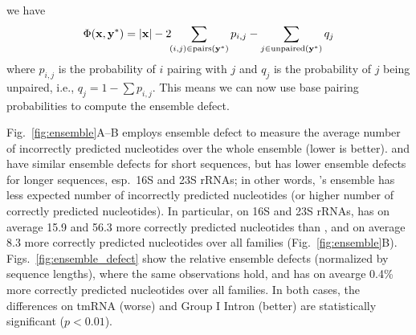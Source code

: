   we have~\cite{Zadeh+:2010}
\begin{equation}
\vspace{-0.2cm}
\begin{split}
\Phi(\vecx,\vecystar) = |\vecx| - 2\!\! \sum_{(i,j) \in \pairs(\vecystar)} p_{i,j} - \sum_{j \in \unpaired(\vecystar)} q_{j} \notag
\end{split}
\label{eq:phi2}
\vspace{-0.2cm}
\end{equation}
where $p_{i,j}$ is the probability of $i$ pairing with $j$ %
and $q_{j}$ is the probability of $j$ being unpaired, i.e., $q_j = 1- \sum p_{i,j}$.
This means we can now use base pairing probabilities to compute the ensemble defect.






Fig.~\ref{fig:ensemble}A--B employs ensemble defect to measure 
the average number %
of incorrectly predicted nucleotides over the whole ensemble (lower is better).
\viennarnafold and \linearpartition have similar ensemble defects for short sequences, %
but \linearpartition has lower ensemble defects for longer sequences, esp.~16S and 23S rRNAs;
in other words, \linearpartition's ensemble has less expected number of incorrectly predicted nucleotides
(or higher number of correctly predicted nucleotides). %
In particular, on 16S and 23S rRNAs, \linearpartition has on average 15.9 and 56.3 more correctly predicted nucleotides than \rnafold,
and on average 8.3 more correctly predicted nucleotides over all families (Fig.~\ref{fig:ensemble}B).
Figs.~\ref{fig:ensemble_defect} show the relative ensemble defects (normalized by sequence lengths),
where the same observations hold, and \linearpartition has on avearge 0.4\% more correctly predicted nucleotides over all families.
In both cases, the differences on tmRNA (worse) and Group I Intron (better) are statistically significant ($p<0.01$).



